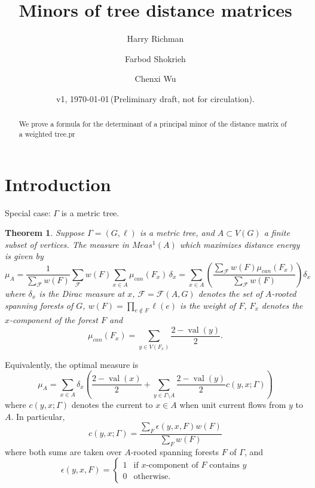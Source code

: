 \documentclass{amsart}
\newtheorem{thm}{Theorem}
\theoremstyle{definition}
\DeclareMathOperator{\val}{val}
\begin{document}
\title[Tree distance minors]{Minors of tree distance matrices}
\author{Harry Richman}
\author{Farbod Shokrieh}
\author{Chenxi Wu}
\date{v1, \today  \,(Preliminary draft, not for circulation).}


\begin{abstract}
We prove a formula for the determinant of 
a principal minor of
the distance matrix of a weighted tree.pr
\end{abstract}
\maketitle

\setcounter{tocdepth}{1}
\tableofcontents

\section{Introduction}

\cite{graham-hoffman-hosoya}

Special case: $\Gamma$ is a metric tree.
\begin{thm}\label{thm:max-measure}
Suppose $\Gamma = (G,\ell)$ is a metric tree,
and $A \subset V(G)$ a finite subset of vertices.
The measure in $Meas^1(A)$
which maximizes distance energy is given by
\begin{equation}\label{eq:max-measure}
\mu_A = \frac1{\displaystyle \sum_{\mathcal F} w(F)} \sum_{\mathcal F} w(F) \sum_{x \in A}  \mu_{can}(F_x) \,\delta_x
= \sum_{x\in A} \left( \frac{\sum_{\mathcal F} w(F) \mu_{can}(F_x)}{\sum_{\mathcal F} w(F)} \right) \delta_x
\end{equation}
where $\delta_x$ is the Dirac measure at $x$,
$\mathcal F = \mathcal F(A,G)$ denotes the set of $A$-rooted spanning forests of $G$,
$w(F)= \prod_{e \not \in F} \ell(e) $
is the weight of $F$,
$F_x$ denotes the $x$-component of the forest $F$
and
$$
\mu_{can}(F_x) = \sum_{y \in V(F_x)} \frac{2 - \val(y)}{2}.
$$
\end{thm}

Equivalently, the optimal measure is
$$
\mu_A = \sum_{x \in A} \delta_x\left( \frac{2 - \val(x)}{2} +  \sum_{y \in \Gamma \setminus A} \frac{2 - \val(y)}{2} c(y,x;\Gamma) \right)
$$
where
$c(y,x;\Gamma)$ denotes the current to $x \in A$ when unit current flows from $y$ to $A$.
In particular,
\begin{equation}
c(y,x;\Gamma) = \frac{\sum_F \epsilon(y,x,F) w(F)}{ \sum_F w(F)}
\end{equation}
where both sums are taken over $A$-rooted spanning forests $F$ of $\Gamma$,
and
\begin{equation*}
\epsilon(y,x,F) = \begin{cases}
1 &\text{if $x$-component of $F$ contains $y$} \\
0 &\text{otherwise.}
\end{cases}
\end{equation*}
\end{document}
